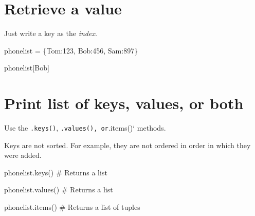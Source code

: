 \documentclass[
  letterpaper,
  DIV=11,
  numbers=noendperiod]{scrreprt}
\newenvironment{Shaded}{\begin{snugshade}}{\end{snugshade}}
\newcommand{\CommentTok}[1]{\textcolor[rgb]{0.37,0.37,0.37}{#1}}
\newcommand{\DecValTok}[1]{\textcolor[rgb]{0.68,0.00,0.00}{#1}}
\newcommand{\NormalTok}[1]{\textcolor[rgb]{0.00,0.23,0.31}{#1}}
\newcommand{\OperatorTok}[1]{\textcolor[rgb]{0.37,0.37,0.37}{#1}}
\newcommand{\StringTok}[1]{\textcolor[rgb]{0.13,0.47,0.30}{#1}}
\begin{document}
\hypertarget{retrieve-a-value}{%
\section{Retrieve a value}\label{retrieve-a-value}}

Just write a key as the \emph{index}.

\begin{Shaded}
\begin{Highlighting}[]
\NormalTok{phonelist }\OperatorTok{=}\NormalTok{ \{}\StringTok{\textquotesingle{}Tom\textquotesingle{}}\NormalTok{:}\DecValTok{123}\NormalTok{, }\StringTok{\textquotesingle{}Bob\textquotesingle{}}\NormalTok{:}\DecValTok{456}\NormalTok{, }\StringTok{\textquotesingle{}Sam\textquotesingle{}}\NormalTok{:}\DecValTok{897}\NormalTok{\}}
\end{Highlighting}
\end{Shaded}

\begin{Shaded}
\begin{Highlighting}[]
\NormalTok{phonelist[}\StringTok{\textquotesingle{}Bob\textquotesingle{}}\NormalTok{]}
\end{Highlighting}
\end{Shaded}

\hypertarget{print-list-of-keys-values-or-both}{%
\section{Print list of keys, values, or
both}\label{print-list-of-keys-values-or-both}}

Use the \texttt{.keys()},
\texttt{.values()\textquotesingle{},\ or}.items()` methods.

Keys are not sorted. For example, they are not ordered in order in which
they were added.

\begin{Shaded}
\begin{Highlighting}[]
\NormalTok{phonelist.keys() }\CommentTok{\# Returns a list}
\end{Highlighting}
\end{Shaded}

\begin{Shaded}
\begin{Highlighting}[]
\NormalTok{phonelist.values() }\CommentTok{\# Returns a list}
\end{Highlighting}
\end{Shaded}

\begin{Shaded}
\begin{Highlighting}[]
\NormalTok{phonelist.items() }\CommentTok{\# Returns a list of tuples}
\end{Highlighting}
\end{Shaded}
\end{document}
